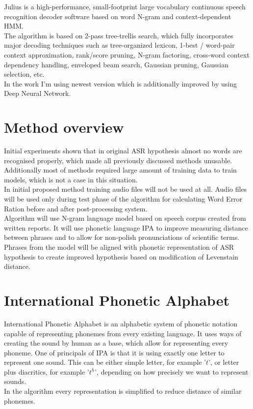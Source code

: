 \documentclass[a4paper,11pt,twoside]{report}
\theoremstyle{definition}
\begin{document}
Julius is a high-performance, small-footprint large vocabulary continuous speech recognition decoder software based on word N-gram and context-dependent HMM.\\
The algorithm is based on 2-pass tree-trellis search, which fully incorporates major decoding techniques such as tree-organized lexicon, 1-best / word-pair context approximation, rank/score pruning, N-gram factoring, cross-word context dependency handling, enveloped beam search, Gaussian pruning, Gaussian selection, etc. \\
In the work I'm using newest version which is additionally improved by using Deep Neural Network.


\section{Method overview}

Initial experiments shown that in original ASR hypothesis almost no words are recognised properly, which made all previously discussed methods unusable. Additionally most of methods required large amount of training data to train models, which is not a case in this situation. \\

In initial proposed method training audio files will not be used at all. Audio files will be used only during test phase of the algorithm for calculating Word Error Ration before and after post-processing system. \\

Algorithm will use N-gram language model based on speech corpus created from written reports. It will use phonetic language IPA to improve measuring distance between phrases and to allow for non-polish pronunciations of scientific terms. Phrases from the model will be aligned with phonetic representation of ASR hypothesis to create improved hypothesis based on modification of Levenstain distance.\\


\section{International Phonetic Alphabet}

International Phonetic Alphabet is an alphabetic system of phonetic notation capable of representing phonemes from every existing language. It uses ways of creating the sound by human as a base, which allow for representing every phoneme. One of principals of IPA is that it is using exactly one letter to represent one sound. This can be either simple letter, for example '$t$', or letter plus diacritics, for example '$t^h$', depending on how precisely we want to represent sounds. \\
In the algorithm every representation is simplified to reduce distance of similar phonemes. 
\end{document}
